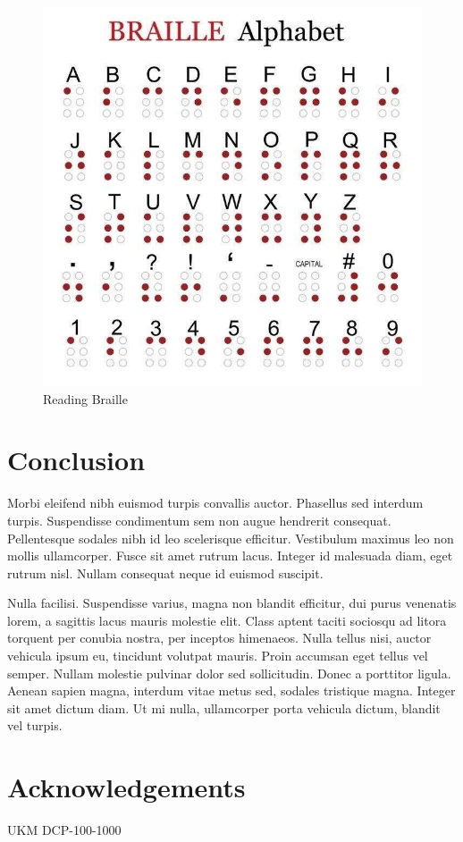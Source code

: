 \documentclass[onecolumn]{article}
\makeatletter
\def\checkGraphicsWidth{\ifdim\Gin@nat@width>\linewidth
	\tsGraphicsScaleX\linewidth\else\Gin@nat@width\fi}
\def\fixFloatSize#1{}
\let\ts@includegraphics\includegraphics
\renewcommand{\includegraphics}[1]{\ts@includegraphics[width=\checkGraphicsWidth]{#1}}
\makeatother
\begin{document}
\bgroup
\fixFloatSize{images/read-braille.jpg}
\begin{figure}[!htbp]
\centering 
\includegraphics{images/read-braille.jpg}
\caption{{Reading Braille}}
\label{f-056fed0128b2}
\end{figure}
\egroup
    
\section*{Conclusion}
Morbi eleifend nibh euismod turpis convallis auctor. Phasellus sed interdum
turpis. Suspendisse condimentum sem non augue hendrerit consequat.
Pellentesque sodales nibh id leo scelerisque efficitur. Vestibulum maximus
leo non mollis ullamcorper\cite{Vogel:1979}. Fusce sit amet rutrum lacus. Integer id
malesuada diam, eget rutrum nisl. Nullam consequat neque id euismod
suscipit.

Nulla facilisi. Suspendisse varius, magna non blandit efficitur, dui purus
venenatis lorem, a sagittis lacus mauris molestie elit. Class aptent taciti
sociosqu ad litora torquent per conubia nostra, per inceptos himenaeos.
Nulla tellus nisi, auctor vehicula ipsum eu, tincidunt volutpat mauris.
Proin accumsan eget tellus vel semper. Nullam molestie pulvinar dolor sed
sollicitudin. Donec a porttitor ligula. Aenean sapien magna, interdum vitae
metus sed, sodales tristique magna. Integer sit amet dictum diam. Ut mi
nulla, ullamcorper porta vehicula dictum, blandit vel turpis.
    
\section*{Acknowledgements} UKM DCP-100-1000
    



\end{document}
